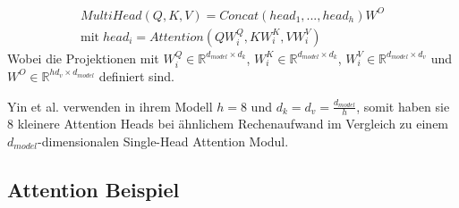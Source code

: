 \documentclass[conference]{IEEEtran}
\begin{document}
\begin{eqnarray} \label{eq:multi_head_attention}
    MultiHead(Q,K,V) = Concat(head_1,...,head_h)W^O \\
    \text{mit} \; head_i = Attention(QW_i^Q , KW_i^K , VW_i^V)
\end{eqnarray}
Wobei die Projektionen mit $W_i^Q \in \mathbb{R}^{d_{model} \times d_k}$, $W_i^K \in \mathbb{R}^{d_{model} \times d_k}$, $W_i^V \in \mathbb{R}^{d_{model} \times d_v}$ und $W^O \in \mathbb{R}^{hd_v \times d_{model}}$ definiert sind. \cite{attention_is_all_you_need}

Yin et al. \cite{attention_is_all_you_need} verwenden in ihrem Modell $h = 8$ und $d_k = d_v = \frac{d_{model}}{h}$, somit haben sie 8 kleinere Attention Heads bei ähnlichem Rechenaufwand im Vergleich zu einem $d_{model}$-dimensionalen Single-Head Attention Modul.

\subsection{Attention Beispiel}
\end{document}
